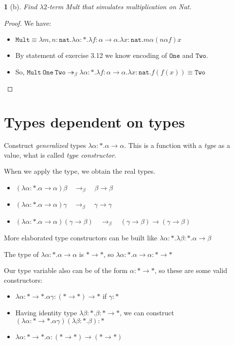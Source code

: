 \documentclass[12pt, a4paper]{article}
\newcommand{\twobeta}{\twoheadrightarrow_\beta}
\newcommand{\onebeta}{\to_\beta}
\newtheorem*{exercise}{}
\begin{document}
\begin{exercise}[b]
    Find $\lambda2$-term \textit{Mult} that simulates multiplication on \textit{Nat}.
\end{exercise}
\begin{proof}
    We have:
    \begin{itemize}
        \item $\mathtt{Mult} \equiv \lambda m,n : \mathtt{nat}. \lambda \alpha : * . \lambda f : \alpha \to \alpha. \lambda x : \mathtt{nat}. m\alpha(n \alpha f)x$
        \item By statement of exercise 3.12 we know encoding of $\mathtt{One}$ and $\mathtt{Two}$.
        \item So, $\mathtt{Mult\ One\ Two} \twobeta \lambda \alpha : *. \lambda f: \alpha \to \alpha. \lambda x : \mathtt{nat}. f(f(x)) \equiv \mathtt{Two}$
    \end{itemize}
\end{proof}

\section{Types dependent on types}
Construct \textit{generalized} types $\lambda \alpha : * . \alpha \to \alpha$. This is a function with a \textit{type} as a value, what is called \textit{type constructor}.

When we apply the type, we obtain the real types.
\begin{itemize}
    \item $(\lambda \alpha : * . \alpha \to \alpha)\beta \quad \onebeta \quad \beta \to \beta$
    \item $(\lambda \alpha : * . \alpha \to \alpha)\gamma \quad \onebeta \quad \gamma \to \gamma$
    \item $(\lambda \alpha : * . \alpha \to \alpha)(\gamma \to \beta) \quad \onebeta \quad (\gamma \to \beta) \to (\gamma \to \beta)$
\end{itemize}

More elaborated type constructors can be built like $\lambda \alpha : * . \lambda \beta : * . \alpha \to \beta$

The type of $\lambda \alpha : * . \alpha \to \alpha$ is  $* \to *$, so $\lambda \alpha : * . \alpha \to \alpha : * \to *$

Our type variable also can be of the form $\alpha : * \to *$, so these are some valid constructors:

\begin{itemize}
    \item $\lambda \alpha : * \to * . \alpha \gamma : (* \to *) \to *$ if $\gamma : *$
    \item Having identity type $\lambda \beta : * . \beta : * \to *$, we can construct \newline
    $(\lambda \alpha : * \to *. \alpha \gamma)(\lambda \beta : * . \beta) : *$
    \item $\lambda \alpha : * \to * . \alpha : (* \to *) \to (* \to *)$
\end{itemize}
\end{document}
